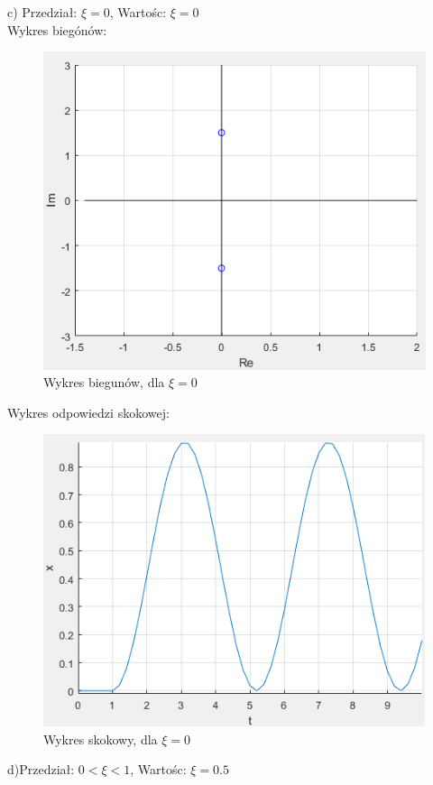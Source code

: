 \documentclass{article}
\begin{document}
\begin{flushleft}
 
 c) Przedział: $\xi=0$, Wartośc: $\xi=0$\\
 
 
 Wykres biegónów:\\
 \begin{figure}[h!]
    \centering
    \includegraphics[scale=0.6]{biegunyksi0png.png}
    \caption{Wykres biegunów, dla $\xi=0$}
    \label{fig:bieguny_ksi_0}
 \end{figure}
 
 
 Wykres odpowiedzi skokowej:\\
 \begin{figure}[h!]
     \centering
    \includegraphics[scale=0.6]{skokksi0.png}
     \caption{Wykres skokowy, dla $\xi=0$}
     \label{fig:ksi_0}
 \end{figure}
 d)Przedział: $0<\xi<1$, Wartośc: $\xi=0.5$\\
 

\end{flushleft}
\end{document}
